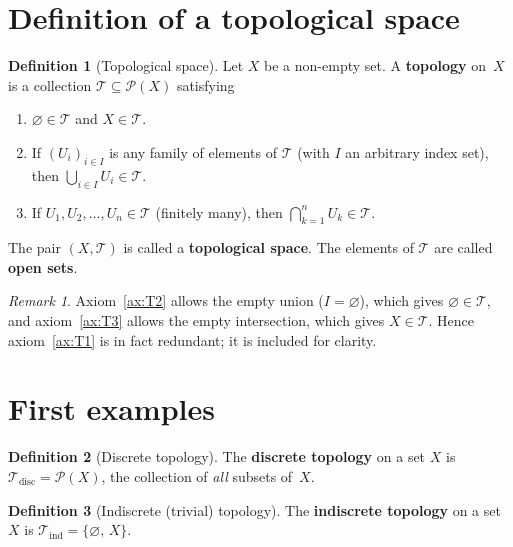 \documentclass[11pt,a4paper,twoside]{book}
\theoremstyle{remark}
\newtheorem{remark}[theorem]{Remark}
\theoremstyle{definition}
\theoremstyle{definition}
\newtheorem{definition}{Definition}[section]
\newcommand{\Tau}{\mathcal{T}}           %
\newcommand{\Pow}{\mathcal{P}}           %
\begin{document}
\section{Definition of a topological space}
\label{sec:def-topological-space}

\begin{definition}[Topological space]\label{def:topological-space}
Let $X$ be a non-empty set.  A \textbf{topology} on~$X$ is a
collection $\Tau\subseteq\Pow(X)$ satisfying
\begin{enumerate}[label=\textup{(T\arabic*)}]
  \item\label{ax:T1} $\varnothing\in\Tau$ and $X\in\Tau$.
  \item\label{ax:T2} If $(U_i)_{i\in I}$ is any family of elements of $\Tau$
        (with $I$ an arbitrary index set), then
        $\displaystyle\bigcup_{i\in I}U_i\in\Tau$.
  \item\label{ax:T3} If $U_1,U_2,\ldots,U_n\in\Tau$ (finitely many), then
        $\displaystyle\bigcap_{k=1}^{n}U_k\in\Tau$.
\end{enumerate}
The pair $(X,\Tau)$ is called a \textbf{topological space}.
The elements of $\Tau$ are called \textbf{open sets}.
\end{definition}

\begin{remark}
Axiom~\ref{ax:T2} allows the empty union ($I=\varnothing$), which gives
$\varnothing\in\Tau$, and axiom~\ref{ax:T3} allows the empty intersection,
which gives $X\in\Tau$.  Hence axiom~\ref{ax:T1} is in fact redundant; it is
included for clarity.
\end{remark}


\section{First examples}
\label{sec:first-examples}

\begin{definition}[Discrete topology]\label{def:discrete}
The \textbf{discrete topology}
on a set $X$ is $\Tau_{\mathrm{disc}}=\Pow(X)$, the collection of \emph{all}
subsets of~$X$.
\end{definition}

\begin{definition}[Indiscrete (trivial) topology]\label{def:indiscrete}
The \textbf{indiscrete topology}
on a set $X$ is $\Tau_{\mathrm{ind}}=\{\varnothing,\,X\}$.
\end{definition}
\end{document}
